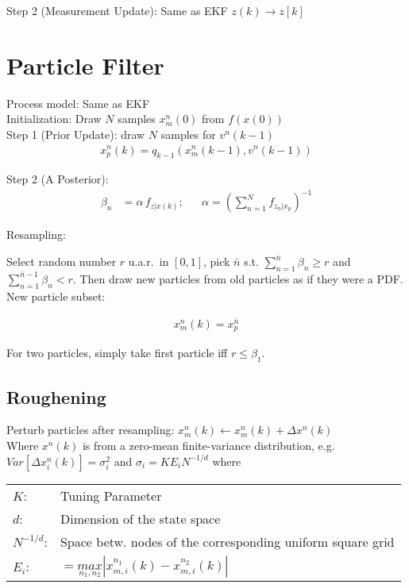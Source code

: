 \documentclass[landscape,a4paper,8pt]{scrartcl}
\begin{document}
\begin{multicols*}{3}
Step 2 (Measurement Update): Same as EKF \quad $z(k) \to z[k]$


\section{Particle Filter}
Process model: Same as EKF \\

Initialization: Draw $N$ samples $x_m^n(0)$ from $f(x(0))$ \\

Step 1 (Prior Update): draw $N$ samples for $v^n (k-1)$
\begin{align*}
x_p^n (k) = q_{k-1} ( x_m^n (k-1), v^n (k-1) )
\end{align*}

Step 2 (A Posterior):
\begin{align*}
\beta_n &= \alpha \, f_{z|x(k)}; & &\alpha = \left( \sum_{n=1}^N f_{z_n|x_p} \right)^{-1}
\end{align*}

Resampling:
\begin{adjustwidth}{0.5cm}{}
Select random number $r$ u.a.r.\ in $[0,1]$, pick $\bar{n}$ s.t. $\sum_{n=1}^{\bar{n}} \beta_n \geq r$ and $\sum_{n=1}^{\bar{n}-1} \beta_n < r$. Then draw new particles from old particles as if they were a PDF. New particle subset: 
\end{adjustwidth}

\begin{align*}
x_m^n (k) = x_p^{\bar{n}}
\end{align*}

For two particles, simply take first particle iff $r \leq \beta_1$.

\subsection{Roughening}
Perturb particles after resampling: $x_m^n (k) \leftarrow x_m^n(k) + \Delta x^n(k)$ \\

Where $x^n(k)$ is from a zero-mean finite-variance distribution, e.g. $Var[\Delta x_i^n(k)] = \sigma_i^2$ and $\sigma_i = K E_i N^{-1/d}$ where \\ %

\begin{tabular}{ll}
$K$: & Tuning Parameter \\
$d$: & Dimension of the state space \\
$N^{-1/d} $: & Space betw. nodes of the corresponding uniform square grid \\
$E_i$: & $=\underset{n_1, n_2}{max}| x_{m,i}^{n_1}(k) - x_{m,i}^{n_2}(k) |$ 
\end{tabular}


\end{multicols*}
\end{document}
